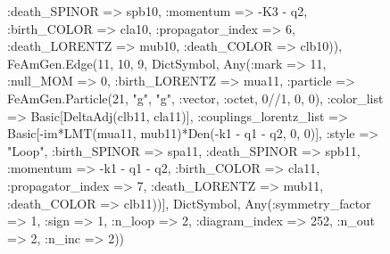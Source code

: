 \documentclass{revtex4}
\begin{document}
\begin{figure}[!htb]
\begin{center}
{:death_SPINOR => spb10, :momentum => -K3 - q2, :birth_COLOR => cla10, :propagator_index => 6, :death_LORENTZ => mub10, :death_COLOR => clb10)), FeAmGen.Edge(11, 10, 9, Dict{Symbol, Any}(:mark => 11, :null_MOM => 0, :birth_LORENTZ => mua11, :particle => FeAmGen.Particle(21, "g", "g", :vector, :octet, 0//1, 0, 0), :color_list => Basic[DeltaAdj(clb11, cla11)], :couplings_lorentz_list => Basic[-im*LMT(mua11, mub11)*Den(-k1 - q1 - q2, 0, 0)], :style => "Loop", :birth_SPINOR => spa11, :death_SPINOR => spb11, :momentum => -k1 - q1 - q2, :birth_COLOR => cla11, :propagator_index => 7, :death_LORENTZ => mub11, :death_COLOR => clb11))], Dict{Symbol, Any}(:symmetry_factor => 1, :sign => 1, :n_loop => 2, :diagram_index => 252, :n_out => 2, :n_inc => 2)) 
}
\end{center}
\end{figure}
\end{document}
